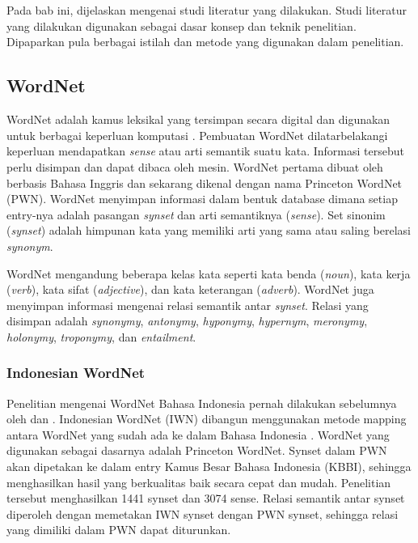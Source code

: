 \chapter{\babDua}
Pada bab ini, dijelaskan mengenai studi literatur yang dilakukan. Studi literatur yang dilakukan digunakan sebagai dasar konsep dan teknik penelitian. Dipaparkan pula berbagai istilah dan metode yang digunakan dalam penelitian.


\section{WordNet}
WordNet adalah kamus leksikal yang tersimpan secara digital dan digunakan untuk berbagai keperluan komputasi \citep{miller1995wordnet}. Pembuatan WordNet dilatarbelakangi keperluan mendapatkan \textit{sense} atau arti semantik suatu kata. Informasi tersebut perlu disimpan dan dapat dibaca oleh mesin. WordNet pertama dibuat oleh \cite{miller1995wordnet} berbasis Bahasa Inggris dan sekarang dikenal dengan nama Princeton WordNet (PWN). WordNet menyimpan informasi dalam bentuk database dimana setiap entry-nya adalah pasangan \textit{synset} dan arti semantiknya (\textit{sense}). Set sinonim (\textit{synset}) adalah himpunan kata yang memiliki arti yang sama atau saling berelasi \textit{synonym}. 

WordNet mengandung beberapa kelas kata seperti kata benda (\textit{noun}), kata kerja (\textit{verb}), kata sifat (\textit{adjective}), dan kata keterangan (\textit{adverb}). WordNet juga menyimpan informasi mengenai relasi semantik antar \textit{synset}. Relasi yang disimpan adalah \textit{synonymy}, \textit{antonymy}, \textit{hyponymy}, \textit{hypernym}, \textit{meronymy}, \textit{holonymy}, \textit{troponymy}, dan \textit{entailment}.

\subsection{Indonesian WordNet}
Penelitian mengenai WordNet Bahasa Indonesia pernah dilakukan sebelumnya oleh \cite{putra2008building} dan \cite{margaretha2008comparing}. Indonesian WordNet (IWN) dibangun menggunakan metode mapping antara WordNet yang sudah ada ke dalam Bahasa Indonesia \citep{putra2008building}. WordNet yang digunakan sebagai dasarnya adalah Princeton WordNet. Synset dalam PWN akan dipetakan ke dalam entry Kamus Besar Bahasa Indonesia (KBBI), sehingga menghasilkan hasil yang berkualitas baik secara cepat dan mudah. Penelitian tersebut menghasilkan 1441 synset dan 3074 sense. Relasi semantik antar synset diperoleh dengan memetakan IWN synset dengan PWN synset, sehingga relasi yang dimiliki dalam PWN dapat diturunkan.

